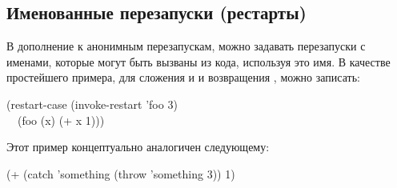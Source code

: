 \subsection{Именованные перезапуски (рестарты)}

В дополнение к анонимным перезапускам, можно задавать перезапуски с именами,
которые могут быть вызваны из кода, используя это имя. В качестве простейшего
примера, для сложения  и  и возвращения , можно записать:
\begin{lisp}
(restart-case (invoke-restart 'foo 3) \\
~~(foo (x) (+ x 1)))
\end{lisp}
Этот пример концептуально аналогичен следующему:
\begin{lisp}
(+ (catch 'something (throw 'something 3)) 1)
\end{lisp}

